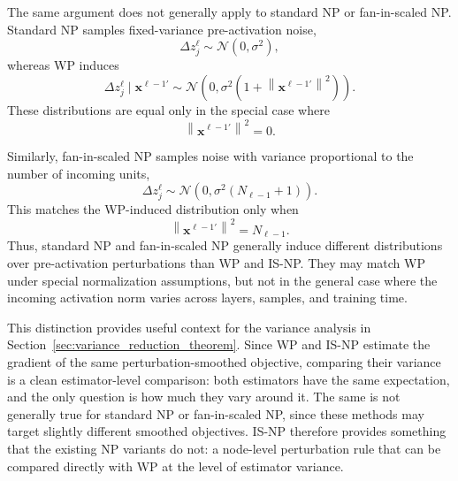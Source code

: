 The same argument does not generally apply to standard NP or fan-in-scaled NP. Standard NP samples fixed-variance pre-activation noise,
\begin{equation}
\Delta z^\ell_j
\sim
\mathcal{N}(0,\sigma^2),
\end{equation}
whereas WP induces
\begin{equation}
\Delta z^\ell_j
\mid
\mathbf{x}^{\ell-1\prime}
\sim
\mathcal{N}
\left(
0,
\sigma^2
\left(1+
\left\|
\mathbf{x}^{\ell-1\prime}
\right\|^2\right)
\right).
\end{equation}
These distributions are equal only in the special case where
\begin{equation}
\left\|
\mathbf{x}^{\ell-1\prime}
\right\|^2
=
0.
\end{equation}

Similarly, fan-in-scaled NP samples noise with variance proportional to the number of incoming units,
\begin{equation}
\Delta z^\ell_j
\sim
\mathcal{N}
\left(
0,
\sigma^2 (N_{\ell-1}+1)
\right).
\end{equation}
This matches the WP-induced distribution only when
\begin{equation}
\left\|
\mathbf{x}^{\ell-1\prime}
\right\|^2
=
N_{\ell-1}.
\end{equation}
Thus, standard NP and fan-in-scaled NP generally induce different distributions over pre-activation perturbations than WP and IS-NP. They may match WP under special normalization assumptions, but not in the general case where the incoming activation norm varies across layers, samples, and training time.

This distinction provides useful context for the variance analysis in Section~\ref{sec:variance_reduction_theorem}. Since WP and IS-NP estimate the gradient of the same perturbation-smoothed objective, comparing their variance is a clean estimator-level comparison: both estimators have the same expectation, and the only question is how much they vary around it. The same is not generally true for standard NP or fan-in-scaled NP, since these methods may target slightly different smoothed objectives. IS-NP therefore provides something that the existing NP variants do not: a node-level perturbation rule that can be compared directly with WP at the level of estimator variance.
